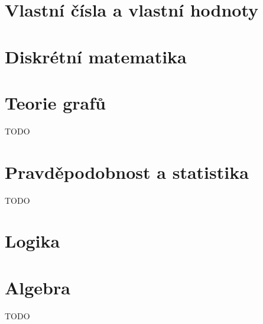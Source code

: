 \section{Vlastní čísla a vlastní hodnoty}


\section{Diskrétní matematika}


\section{Teorie grafů}
TODO

\section{Pravděpodobnost a statistika}
TODO

\section{Logika}


\section{Algebra}
TODO

